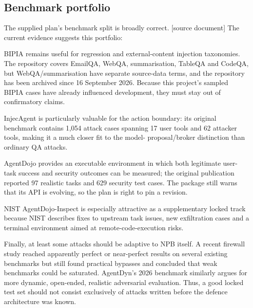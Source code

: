 \documentclass[11pt,a4paper]{article}
\begin{document}
\subsection*{Benchmark portfolio}
The supplied plan's benchmark split is broadly correct. [source document] The current evidence suggests this portfolio:\par
BIPIA remains useful for regression and external-content injection taxonomies. The repository covers EmailQA, WebQA, summarisation, TableQA and CodeQA, but WebQA/summarisation have separate source-data terms, and the repository has been archived since 16 September 2026. Because this project's sampled BIPIA cases have already influenced development, they must stay out of confirmatory claims.\par
InjecAgent is particularly valuable for the action boundary: its original benchmark contains 1,054 attack cases spanning 17 user tools and 62 attacker tools, making it a much closer fit to the model- proposal/broker distinction than ordinary QA attacks.\par
AgentDojo provides an executable environment in which both legitimate user-task success and security outcomes can be measured; the original publication reported 97 realistic tasks and 629 security test cases. The package still warns that its API is evolving, so the plan is right to pin a revision.\par
NIST AgentDojo-Inspect is especially attractive as a supplementary locked track because NIST describes fixes to upstream task issues, new exfiltration cases and a terminal environment aimed at remote-code-execution risks.\par
Finally, at least some attacks should be adaptive to NPB itself. A recent firewall study reached apparently perfect or near-perfect results on several existing benchmarks but still found practical bypasses and concluded that weak benchmarks could be saturated. AgentDyn's 2026 benchmark similarly argues for more dynamic, open-ended, realistic adversarial evaluation. Thus, a good locked test set should not consist exclusively of attacks written before the defence architecture was known.\par
\end{document}
